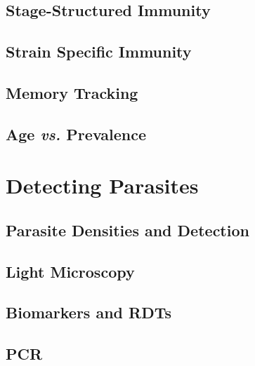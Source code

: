 \documentclass[
]{book}
\begin{document}
\hypertarget{stage-structured-immunity}{%
\section{Stage-Structured Immunity}\label{stage-structured-immunity}}

\hypertarget{strain-specific-immunity}{%
\section{Strain Specific Immunity}\label{strain-specific-immunity}}

\hypertarget{memory-tracking}{%
\section{Memory Tracking}\label{memory-tracking}}

\hypertarget{age-vs.-prevalence}{%
\section{\texorpdfstring{Age \emph{vs.} Prevalence}{Age vs. Prevalence}}\label{age-vs.-prevalence}}

\hypertarget{detecting-parasites}{%
\chapter{Detecting Parasites}\label{detecting-parasites}}

\hypertarget{parasite-densities-and-detection}{%
\section{Parasite Densities and Detection}\label{parasite-densities-and-detection}}

\hypertarget{light-microscopy}{%
\section{Light Microscopy}\label{light-microscopy}}

\hypertarget{biomarkers-and-rdts}{%
\section{Biomarkers and RDTs}\label{biomarkers-and-rdts}}

\hypertarget{pcr}{%
\section{PCR}\label{pcr}}
\end{document}
